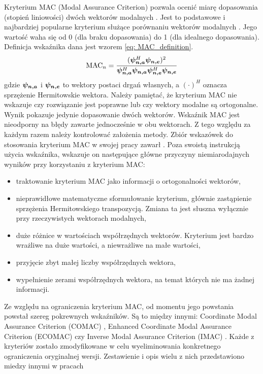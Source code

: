 Kryterium MAC (Modal Assurance Criterion) pozwala ocenić miarę dopasowania (stopień liniowości) dwóch wektorów modalnych \parencite{Allemang1982}. Jest to podstawowe i najbardziej popularne kryterium służące porównaniu wektorów modalnych \cite{Rainieri2014}. Jego wartość waha się od 0 (dla braku dopasowania) do 1 (dla idealnego dopasowania). Definicja wskaźnika dana jest wzorem \ref{eq: MAC_definition}.
\begin{equation} \label{eq: MAC_definition}
	\text{MAC}_n = \frac{ (\bm{\psi_{n,a}}^H\bm{\psi_{n,e}})^2}
	{\bm{\psi_{n,a}}^H\bm{\psi_{n,a}}\bm{\psi_{n,e}}^H\bm{\psi_{n,e}}}
\end{equation}
gdzie $\bm{\psi_{n,a}}$ i $\bm{\psi_{n,e}}$ to wektory postaci drgań własnych, a $(\cdot)^H$ oznacza sprzężenie Hermitowskie wektora.
Należy pamiętać, że kryterium MAC nie wskazuje czy rozwiązanie jest poprawne lub czy wektory modalne są ortogonalne. Wynik pokazuje jedynie dopasowanie dwóch wektorów. Wskaźnik MAC jest nieodporny na błędy zawarte jednocześnie w obu wektorach. Z tego względu za każdym razem należy kontrolować założenia metody. Zbiór wskazówek do stosowania kryterium MAC w swojej pracy zawarł \cite{Allemang2003}. Poza swoistą instrukcją użycia wskaźnika, wskazuje on następujące główne przyczyny niemiarodajnych wyników przy korzystaniu z kryterium MAC:
\begin{itemize}[noitemsep]
	\item traktowanie kryterium MAC jako informacji o ortogonalności wektorów,
	\item nieprawidłowe matematyczne sformułowanie kryterium, głównie zastąpienie sprzężenia Hermitowskiego transpozycją. Zmiana ta jest słuszna wyłącznie przy rzeczywistych wektorach modalnych,
	\item duże różnice w wartościach współrzędnych wektorów. Kryterium jest bardzo wrażliwe na duże wartości, a niewrażliwe na małe wartości,
	\item przyjęcie zbyt małej liczby współrzędnych wektora,
	\item wypełnienie zerami współrzędnych wektora, na temat których nie ma żadnej informacji.
\end{itemize}

Ze względu na ograniczenia kryterium MAC, od momentu jego powstania powstał szereg pokrewnych wskaźników. Są to między innymi: Coordinate Modal Assurance Criterion (COMAC) \parencite{Ewins2000}, Enhanced Coordinate Modal Assurance Criterion (ECOMAC) \parencite{Hunt1992} czy Inverse Modal Assurance Criterion (IMAC) \parencite{MITCHELL1998}. Każde z kryteriów zostało zmodyfikowane w celu wyeliminowania konkretnego ograniczenia oryginalnej wersji. Zestawienie i opis wielu z nich przedstawiono miedzy innymi w pracach \parencite{Allemang2003,Rainieri2014,Szafranski2013,Salamak2003} 

